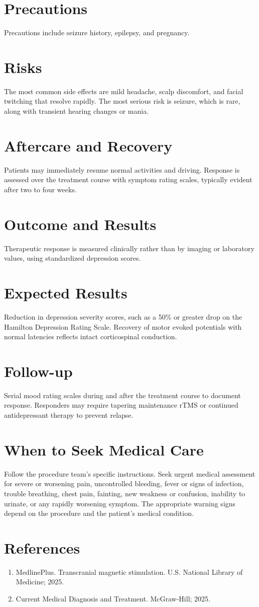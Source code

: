 \section*{Precautions}
Precautions include seizure history, epilepsy, and pregnancy.

\section*{Risks}
The most common side effects are mild headache, scalp discomfort, and facial twitching that resolve rapidly. The most serious risk is seizure, which is rare, along with transient hearing changes or mania.

\section*{Aftercare and Recovery}
Patients may immediately resume normal activities and driving. Response is assessed over the treatment course with symptom rating scales, typically evident after two to four weeks.

\section*{Outcome and Results}
Therapeutic response is measured clinically rather than by imaging or laboratory values, using standardized depression scores.

\section*{Expected Results}
Reduction in depression severity scores, such as a 50\% or greater drop on the Hamilton Depression Rating Scale. Recovery of motor evoked potentials with normal latencies reflects intact corticospinal conduction.

\section*{Follow-up}
Serial mood rating scales during and after the treatment course to document response. Responders may require tapering maintenance rTMS or continued antidepressant therapy to prevent relapse.

\section*{When to Seek Medical Care}
Follow the procedure team's specific instructions. Seek urgent medical assessment for severe or worsening pain, uncontrolled bleeding, fever or signs of infection, trouble breathing, chest pain, fainting, new weakness or confusion, inability to urinate, or any rapidly worsening symptom. The appropriate warning signs depend on the procedure and the patient's medical condition.

\section*{References}
\begin{enumerate}
  \item MedlinePlus. Transcranial magnetic stimulation. U.S. National Library of Medicine; 2025.
  \item Current Medical Diagnosis and Treatment. McGraw-Hill; 2025.
\end{enumerate}

\clearpage
